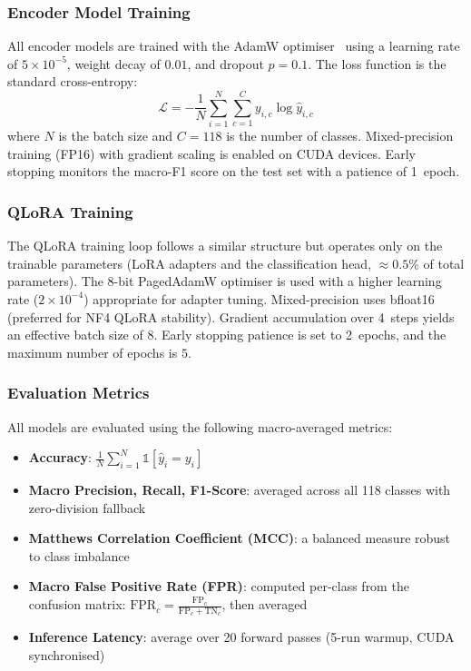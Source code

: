 \subsubsection{Encoder Model Training}
All encoder models are trained with the AdamW optimiser~\cite{loshchilov2019decoupled} using a learning
rate of $5 \times 10^{-5}$, weight decay of $0.01$, and dropout
$p = 0.1$.  The loss function is the standard cross-entropy:
\begin{equation}
    \mathcal{L} = -\frac{1}{N}\sum_{i=1}^{N}\sum_{c=1}^{C}
        y_{i,c} \log \hat{y}_{i,c}
\label{eq:ce_loss}
\end{equation}
where $N$ is the batch size and $C = 118$ is the number of classes.
Mixed-precision training (FP16) with gradient scaling is enabled on CUDA
devices.  Early stopping monitors the macro-F1 score on the test set with a
patience of 1~epoch.

\subsubsection{QLoRA Training}
The QLoRA training loop follows a similar structure but operates only on
the trainable parameters (LoRA adapters and the classification head,
$\approx\!0.5\%$ of total parameters).  The 8-bit PagedAdamW optimiser
is used with a higher learning rate ($2 \times 10^{-4}$) appropriate for
adapter tuning.  Mixed-precision uses bfloat16 (preferred for NF4 QLoRA
stability).  Gradient accumulation over 4~steps yields an effective batch
size of $8$.  Early stopping patience is set to 2~epochs, and the maximum
number of epochs is $5$.

\subsubsection{Evaluation Metrics}
All models are evaluated using the following macro-averaged metrics:
\begin{itemize}
    \item \textbf{Accuracy}: $\frac{1}{N}\sum_{i=1}^{N}
          \mathbb{1}[\hat{y}_i = y_i]$
    \item \textbf{Macro Precision, Recall, F1-Score}: averaged
          across all 118 classes with zero-division fallback
    \item \textbf{Matthews Correlation Coefficient (MCC)}: a balanced
          measure robust to class imbalance
    \item \textbf{Macro False Positive Rate (FPR)}: computed per-class
          from the confusion matrix:
          $\text{FPR}_c = \frac{\text{FP}_c}{\text{FP}_c + \text{TN}_c}$,
          then averaged
    \item \textbf{Inference Latency}: average over 20 forward passes
          (5-run warmup, CUDA synchronised)
\end{itemize}

